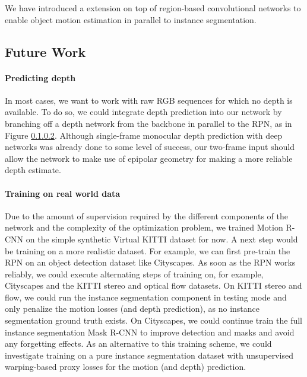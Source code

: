 We have introduced a extension on top of region-based convolutional networks to enable object motion estimation
in parallel to instance segmentation.

\subsection{Future Work}
\paragraph{Predicting depth}
In most cases, we want to work with raw RGB sequences for which no depth is available.
To do so, we could integrate depth prediction into our network by branching off a
depth network from the backbone in parallel to the RPN, as in Figure \ref{}.
Although single-frame monocular depth prediction with deep networks was already done
to some level of success,
our two-frame input should allow the network to make use of epipolar
geometry for making a more reliable depth estimate.

\paragraph{Training on real world data}
Due to the amount of supervision required by the different components of the network
and the complexity of the optimization problem,
we trained Motion R-CNN on the simple synthetic Virtual KITTI dataset for now.
A next step would be training on a more realistic dataset.
For example, we can first pre-train the RPN on an object detection dataset like
Cityscapes. As soon as the RPN works reliably, we could execute alternating
steps of training on, for example, Cityscapes and the KITTI stereo and optical flow datasets.
On KITTI stereo and flow, we could run the instance segmentation component in testing mode and only penalize
the motion losses (and depth prediction), as no instance segmentation ground truth exists.
On Cityscapes, we could continue train the full instance segmentation Mask R-CNN to
improve detection and masks and avoid any forgetting effects.
As an alternative to this training scheme, we could investigate training on a pure
instance segmentation dataset with unsupervised warping-based proxy losses for the motion (and depth) prediction.
